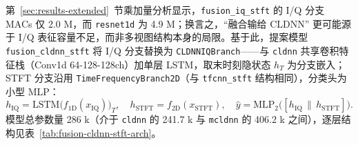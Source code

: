 第~\ref{sec:results-extended}~节乘加量分析显示，\texttt{fusion\_iq\_stft} 的 I/Q 分支 MACs 仅 2.0 M，而 \texttt{resnet1d} 为 4.9 M；换言之，``融合输给 CLDNN'' 更可能源于 I/Q 表征容量不足，而非多视图结构本身的局限。基于此，提案模型 \texttt{fusion\_cldnn\_stft} 将 I/Q 分支替换为 \texttt{CLDNNIQBranch}——与 \texttt{cldnn} 共享卷积特征栈（Conv1d 64-128-128ch）加单层 LSTM\cite{sainath2015cldnn,hochreiter1997lstm}，取末时刻隐状态 \(h_T\) 为分支嵌入；STFT 分支沿用 \texttt{TimeFrequencyBranch2D}（与 \texttt{tfcnn\_stft} 结构相同\cite{ioffe2015batchnorm}），分类头为小型 MLP\cite{srivastava2014dropout}：
\begin{equation}
  h_{\mathrm{IQ}}=\mathrm{LSTM}\bigl(f_{\mathrm{1D}}(x_{\mathrm{IQ}})\bigr)_T,\quad
  h_{\mathrm{STFT}}=f_{\mathrm{2D}}(x_{\mathrm{STFT}}),\quad
  \hat{y}=\mathrm{MLP}_2\!\bigl([h_{\mathrm{IQ}}\,\|\,h_{\mathrm{STFT}}]\bigr).
  \label{eq:fusion-cldnn-stft}
\end{equation}
模型总参数量 286 k（介于 \texttt{cldnn} 的 241.7 k 与 \texttt{mcldnn} 的 406.2 k 之间），逐层结构见表~\ref{tab:fusion-cldnn-stft-arch}。

